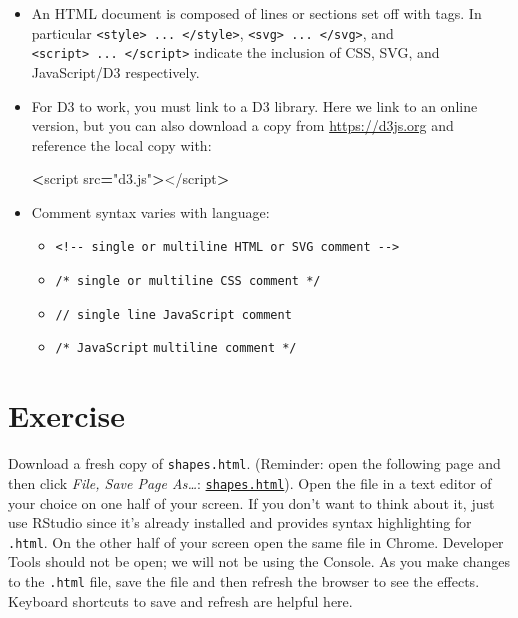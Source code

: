 \documentclass[openany]{book}
\newenvironment{Shaded}{\begin{snugshade}}{\end{snugshade}}
\newcommand{\NormalTok}[1]{#1}
\newcommand{\OperatorTok}[1]{\textcolor[rgb]{0.81,0.36,0.00}{\textbf{#1}}}
\newcommand{\StringTok}[1]{\textcolor[rgb]{0.31,0.60,0.02}{#1}}
\begin{document}
\begin{itemize}
\item
  An HTML document is composed of lines or sections set off with tags. In particular \texttt{\textless{}style\textgreater{}\ ...\ \textless{}/style\textgreater{}}, \texttt{\textless{}svg\textgreater{}\ ...\ \textless{}/svg\textgreater{}}, and \texttt{\textless{}script\textgreater{}\ ...\ \textless{}/script\textgreater{}} indicate the inclusion of CSS, SVG, and JavaScript/D3 respectively.
\item
  For D3 to work, you must link to a D3 library. Here we link to an online version, but you can also download a copy from \url{https://d3js.org} and reference the local copy with:

\begin{Shaded}
\begin{Highlighting}[]
\OperatorTok{<}\NormalTok{script src}\OperatorTok{=}\StringTok{"d3.js"}\OperatorTok{>}\NormalTok{</script}\OperatorTok{>}
\end{Highlighting}
\end{Shaded}
\item
  Comment syntax varies with language:

  \begin{itemize}
  \item
    \texttt{\textless{}!-\/-\ single\ or\ multiline\ HTML\ or\ SVG\ comment\ -\/-\textgreater{}}
  \item
    \texttt{/*\ single\ or\ multiline\ CSS\ comment\ */}
  \item
    \texttt{//\ single\ line\ JavaScript\ comment}
  \item
    \texttt{/*\ JavaScript} \texttt{multiline\ comment\ */}
  \end{itemize}
\end{itemize}

\hypertarget{exercise-1}{%
\section{Exercise }\label{exercise-1}}

Download a fresh copy of \texttt{shapes.html}. (Reminder: open the following page and then click \emph{File, Save Page As\ldots{}}: \href{https://raw.githubusercontent.com/jtr13/d3book/master/code/shapes.html}{\texttt{shapes.html}}). Open the file in a text editor of your choice on one half of your screen. If you don't want to think about it, just use RStudio since it's already installed and provides syntax highlighting for \texttt{.html}. On the other half of your screen open the same file in Chrome. Developer Tools should not be open; we will not be using the Console. As you make changes to the \texttt{.html} file, save the file and then refresh the browser to see the effects. Keyboard shortcuts to save and refresh are helpful here.
\end{document}
